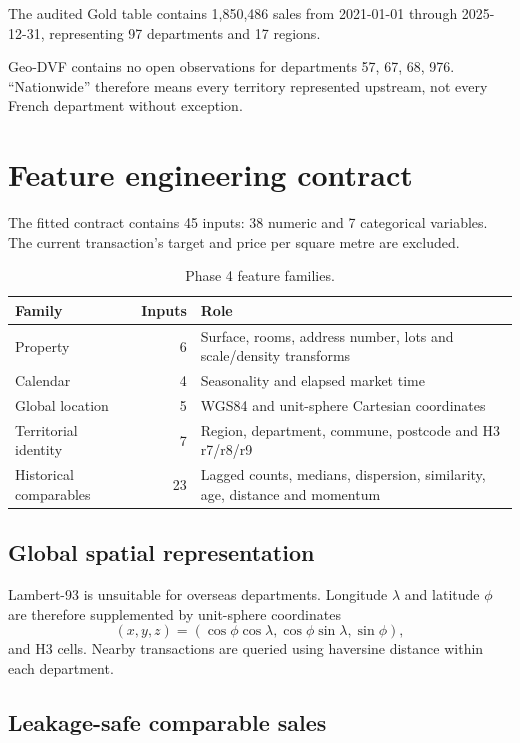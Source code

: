 \documentclass[11pt,a4paper]{article}
\begin{document}
The audited Gold table contains 1,850,486 sales from
2021-01-01 through 2025-12-31, representing
97 departments and 17 regions.

Geo-DVF contains no open observations for departments 57, 67, 68, 976.
``Nationwide'' therefore means every territory represented upstream, not every
French department without exception.

\section{Feature engineering contract}

The fitted contract contains 45 inputs:
38 numeric and
7 categorical variables. The current
transaction's target and price per square metre are excluded.

\begin{table}[H]
\centering
\caption{Phase 4 feature families.}
\begin{tabularx}{\textwidth}{p{3.4cm}rX}
\toprule
Family & Inputs & Role \\
\midrule
Property & 6 & Surface, rooms, address number, lots and scale/density transforms \\
Calendar & 4 & Seasonality and elapsed market time \\
Global location & 5 & WGS84 and unit-sphere Cartesian coordinates \\
Territorial identity & 7 & Region, department, commune, postcode and H3 r7/r8/r9 \\
Historical comparables & 23 & Lagged counts, medians, dispersion, similarity, age, distance and momentum \\
\bottomrule
\end{tabularx}
\end{table}

\subsection{Global spatial representation}

Lambert-93 is unsuitable for overseas departments. Longitude $\lambda$ and
latitude $\phi$ are therefore supplemented by unit-sphere coordinates
\begin{equation}
(x,y,z)=(\cos\phi\cos\lambda,\cos\phi\sin\lambda,\sin\phi),
\end{equation}
and H3 cells. Nearby transactions are queried using haversine distance within
each department.

\subsection{Leakage-safe comparable sales}
\end{document}
